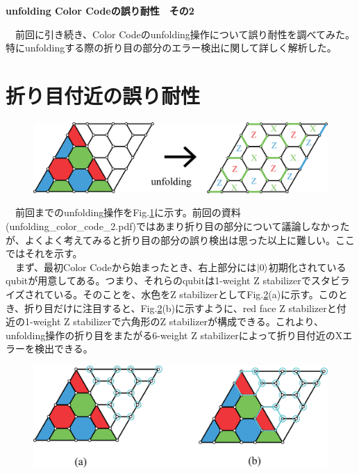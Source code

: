 \documentclass[a4paper,10pt]{ltjsarticle}
\begin{document}
\centerline{\Large\bfseries unfolding Color Codeの誤り耐性　その2}
\vspace{10pt}
　前回に引き続き、Color Codeのunfolding操作について誤り耐性を調べてみた。特にunfoldingする際の折り目の部分のエラー検出に関して詳しく解析した。
\section{折り目付近の誤り耐性}{

    \begin{figure}[h]
        \centering
        \includegraphics[scale=0.2]{figure/figure1.eps}
        \caption{ }
        \label{figure1}
    \end{figure}

    　前回までのunfolding操作をFig.\ref{figure1}に示す。前回の資料(unfolding\_color\_code\_2.pdf)ではあまり折り目の部分について議論しなかったが、よくよく考えてみると折り目の部分の誤り検出は思った以上に難しい。ここではそれを示す。\\
    　まず、最初Color Codeから始まったとき、右上部分には$\ket{0}$初期化されているqubitが用意してある。つまり、それらのqubitは1-weight Z stabilizerでスタビライズされている。そのことを、水色をZ stabilizerとしてFig.\ref{figure2}(a)に示す。このとき、折り目だけに注目すると、Fig.\ref{figure2}(b)に示すように、red face Z stabilizerと付近の1-weight Z stabilizerで六角形のZ stabilizerが構成できる。これより、unfolding操作の折り目をまたがる6-weight Z stabilizerによって折り目付近のXエラーを検出できる。

    \begin{figure}[h]
        \centering
        \includegraphics[scale=0.2]{figure/figure2.eps}
        \caption{ }
        \label{figure2}
    \end{figure}

}
\end{document}
